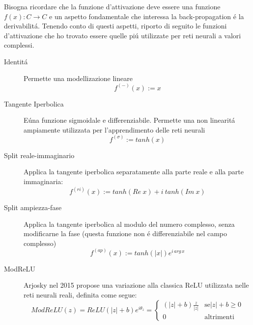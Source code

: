 \documentclass[a4paper,10pt]{article}
\begin{document}
 Bisogna ricordare che la funzione d'attivazione deve essere una funzione $f(x):C \to C$ e un aspetto fondamentale che interessa la back-propagation \'e la derivabilit\'a. Tenendo conto di questi aspetti, riporto di seguito le funzioni d'attivazione che ho trovato essere quelle pi\'u utilizzate per reti neurali a valori complessi.
 \begin{description}
 \item[Identit\'a]
 Permette una modellizazione lineare
 \begin{equation}
  f^{\left(-\right) }\left(x\right) := x
 \end{equation}

 \item[Tangente Iperbolica]
 E\' una funzione sigmoidale e differenziabile. Permette una non linearit\'a ampiamente utilizzata per l'apprendimento delle reti neurali
 \begin{equation}
  f^{\left(\sigma\right) } := tanh\left( x\right)
 \end{equation}

 \item[Split reale-immaginario]
 Applica la tangente iperbolica separatamente alla parte reale e alla parte immaginaria:
 \begin{equation}
  f^{\left( ri\right)} \left( x\right) := tanh\left( Re \ x\right) +i \ tanh\left( Im \ x\right)
 \end{equation}

 \item[Split ampiezza-fase]
 Applica la tangente iperbolica al modulo del numero complesso, senza modificarne la fase (questa funzione non \'e differenziabile nel campo complesso)
 \begin{equation}
  f^{\left( ap\right) } \left( x\right) := tanh\left( \left| x\right|\right) e^{i \, arg \, x}
 \end{equation}
 
 \item[ModReLU]
 Arjosky nel 2015 propose una variazione alla classica ReLU utilizzata nelle reti neurali reali, definita come segue:
 \begin{equation}
  ModReLU\left( z\right) = ReLU\left( \left| z\right|+b\right) e^{i\theta_z} = \begin{cases}
                                                                                               \left(\left| z\right| +b\right) \frac{z}{\left| z\right|} & \mbox{se} \left| z\right| +b \ge 0 \\
                                                                                0 & \mbox{altrimenti}
                                                                

\end{cases}
\end{equation}
\end{description}
\end{document}
